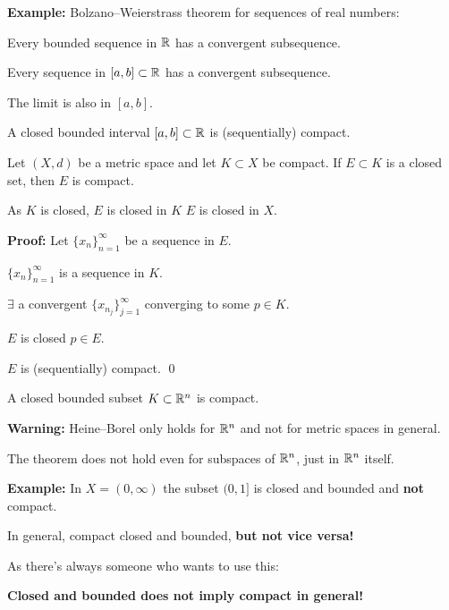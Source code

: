 \documentclass[10pt,aspectratio=149]{beamer}
\begin{document}
\begin{frame}

\textbf{Example:}
Bolzano--Weierstrass theorem for sequences of real numbers:

Every bounded sequence in ${\mathbb{R}}$ has a convergent subsequence.

\pause
\thus \quad Every sequence in $[a,b] \subset {\mathbb{R}}$ has 
a convergent subsequence.

\pause
\thus \quad The limit is also in $[a,b]$.

\pause
\thus \quad A closed bounded interval $[a,b] \subset {\mathbb{R}}$ is (sequentially) compact.

\pause
\begin{proposition}
Let $(X,d)$ be a metric space and let $K \subset X$ be compact.  If
$E \subset K$ is a closed set, then $E$ is compact.
\end{proposition}

\pause
As $K$ is closed, $E$ is closed in $K$ \wiffif
$E$ is closed in $X$.

\pause
\medskip

\textbf{Proof:}
Let $\{ x_n \}_{n=1}^\infty$ be a sequence in $E$.

\pause
$\{ x_n \}_{n=1}^\infty$ is a sequence in $K$.

\pause
\thus \quad $\exists$ a convergent $\{ x_{n_j} \}_{j=1}^\infty$ converging
to some $p \in K$.

\pause
$E$ is closed \wthus $p \in E$.

\pause
\thus \quad $E$ is (sequentially) compact.
\qed

\end{frame}

\begin{frame}

\begin{theorem}
A closed bounded subset $K \subset {\mathbb{R}}^n$ is compact.
\end{theorem}

\pause
\textbf{Warning:}
Heine--Borel only holds for ${\mathbb{R}}^n$ and not for metric spaces in general.

\pause
The theorem does not hold even for subspaces of ${\mathbb{R}}^n$, just in ${\mathbb{R}}^n$
itself.

\pause
\medskip

\textbf{Example:} In $X = (0,\infty)$ the subset $(0,1]$ is closed and
bounded and \textbf{not} compact.

\pause
\medskip

In general, compact \thus closed and bounded, \textbf{but not vice versa!}

\pause
\medskip

As there's always someone who wants to use this:

\pause
\medskip

{\Huge
\textbf{Closed and bounded does not imply compact in general!}
}

\end{frame}
\end{document}
